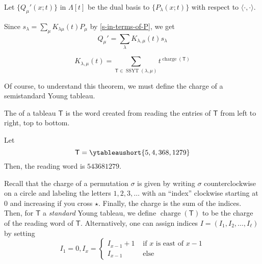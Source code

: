 \documentclass[11pt,leqno,oneside]{amsart}
\numberwithin{thm}{section}
\newcommand{\T}{\mathsf{T}} %
\newcommand{\charge}{\operatorname{charge}}
\newcommand{\SSYT}{\operatorname{SSYT}} %
\newcommand{\sym}{\Lambda}
\begin{document}
\begin{defn}
  Let \(\{Q_\mu'(x;t)\}\) in \(\sym[t]\) be the dual basis to
  \(\{P_\lambda(x;t)\}\) with respect to \(\langle \cdot,\cdot
  \rangle\). 
\end{defn}
\begin{prop}
  Since \(s_\lambda = \sum_\mu K_{\lambda \mu}(t) P_\mu\) by
  \ref{s-in-terms-of-P}, we get \[
    Q_\mu' = \sum_{\lambda} K_{\lambda,\mu}(t) s_\lambda
  \]
\end{prop}
\begin{thm}
  \[
    K_{\lambda,\mu}(t) = \sum_{\T \in \SSYT(\lambda,\mu)} t^{\charge(\T)}
  \]
\end{thm}
Of course, to understand this theorem, we must define the charge of a
semistandard Young tableau.
\begin{defn}
  The  of a tableau \(\T\) is the word created from
  reading the entries of \(\T\) from left to right, top to bottom.
\end{defn}
\begin{example}
  Let \[
    \T = \ytableaushort{5,4,368,1279}
  \]
  Then, the reading word is \(543681279\).
\end{example}
\begin{defn}
  Recall that the charge of a permutation \(\sigma\) is given by
  writing \(\sigma\) counterclockwise on a circle and labeling the
  letters \(1,2,3,\ldots\) with an ``index'' clockwise starting at
  \(0\) and increasing 
  if you cross \(\star\). Finally, the charge is the sum of the
  indices. Then, for \(\T\) a \emph{standard} Young tableau,
  we define \(\charge(\T)\) to be the 
  charge of the reading word of \(\T\). Alternatively, one can assign
  indices \(I=(I_1,I_2, \ldots, I_\ell)\) by setting \[
    I_1 = 0, I_x =
    \begin{cases}
      I_{x-1} + 1 & \text{ if }x\text{ is east of }x-1\\
      I_{x-1} & \text{ else}
    \end{cases}
  \]
\end{defn}
\end{document}
